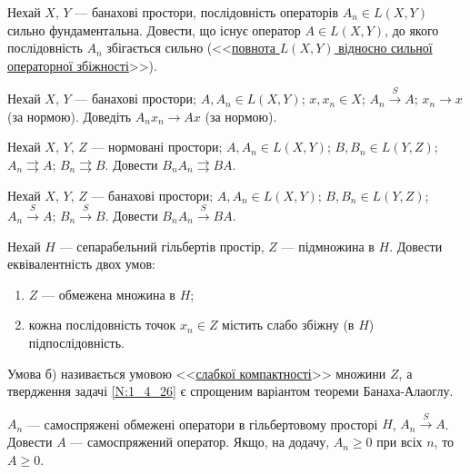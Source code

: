 \begin{exercise}
    Нехай $X$, $Y$ --- банахові простори, послідовність операторів $A_n \in L(X,Y)$ сильно
    фундаментальна. Довести, що існує оператор $A \in L(X,Y)$, до якого послідовність $A_n$
    збігається сильно (<<\uline{повнота $L(X,Y)$ відносно сильної операторної збіжності}>>).
\end{exercise}

\begin{exercise}
    Нехай $X$, $Y$ --- банахові простори; $A, A_n \in L(X,Y)$; $x, x_n \in X$;
    $A_n \overset{S}{\to} A$; $x_n \to x$ (за нормою). Доведіть $A_n x_n \to Ax$ (за нормою).
\end{exercise}

\begin{exercise}
    Нехай $X$, $Y$, $Z$ --- нормовані простори; $A, A_n \in L(X,Y)$; $B, B_n \in L(Y,Z)$;
    $A_n \rightrightarrows A$; $B_n \rightrightarrows B$.
    Довести $B_n A_n \rightrightarrows BA$.
\end{exercise}

\begin{exercise}
    Нехай $X$, $Y$, $Z$ --- банахові простори; $A, A_n \in L(X,Y)$; $B, B_n \in L(Y,Z)$;
    $A_n \overset{S}{\to} A$; $B_n \overset{S}{\to} B$.
    Довести $B_n A_n \overset{S}{\to} BA$.
\end{exercise}

\begin{exercise}\label{N:1_4_26}
    Нехай $H$ --- сепарабельний гільбертів простір, $Z$ --- підмножина в $H$.
    Довести еквівалентність двох умов:
    \begin{enumerate}
        \item $Z$ --- обмежена множина в $H$;
        \item кожна послідовність точок $x_n \in Z$ містить слабо збіжну (в $H$) 
        підпослідовність.
    \end{enumerate}
\end{exercise}

\begin{theory}
    Умова б) називається умовою <<\uline{слабкої компактності}>> множини $Z$,
    а твердження задачі \ref{N:1_4_26} є спрощеним варіантом теореми Банаха-Алаоглу.
\end{theory}

\begin{exercise}
    $A_n$ --- самоспряжені обмежені оператори в гільбертовому просторі $H$,
    $A_n \overset{S}{\to} A$. Довести $A$ --- самоспряжений оператор.
    Якщо, на додачу, $A_n \geq 0$ при всіх $n$, то $A \geq 0$.
\end{exercise}

